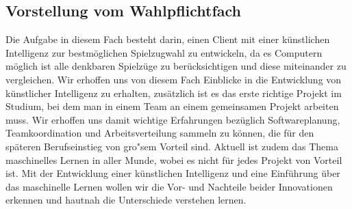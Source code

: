 \subsection{Vorstellung vom Wahlpflichtfach}\label{subsec:vorstellung-vom-wahlpflichtfach}
Die Aufgabe in diesem Fach besteht darin, einen Client mit einer k\"unstlichen Intelligenz zur bestm\"oglichen Spielzugwahl zu entwickeln, da es Computern m\"oglich ist alle denkbaren Spielz\"uge zu ber\"ucksichtigen und diese miteinander zu vergleichen.
Wir erhoffen uns von diesem Fach Einblicke in die Entwicklung von k\"unstlicher Intelligenz zu erhalten, zus\"atzlich ist es das erste richtige Projekt im Studium, bei dem man in einem Team an einem gemeinsamen Projekt arbeiten muss.
Wir erhoffen uns damit wichtige Erfahrungen bez\"uglich Softwareplanung, Teamkoordination und Arbeitsverteilung sammeln zu k\"onnen, die f\"ur den sp\"ateren Berufseinstieg von gro"sem Vorteil sind.
Aktuell ist zudem das Thema maschinelles Lernen in aller Munde, wobei es nicht f\"ur jedes Projekt von Vorteil ist.
Mit der Entwicklung einer k\"unstlichen Intelligenz und eine Einf\"uhrung \"uber das maschinelle Lernen wollen wir die Vor- und Nachteile beider Innovationen erkennen und hautnah die Unterschiede verstehen lernen.


\bigskip
\newpage